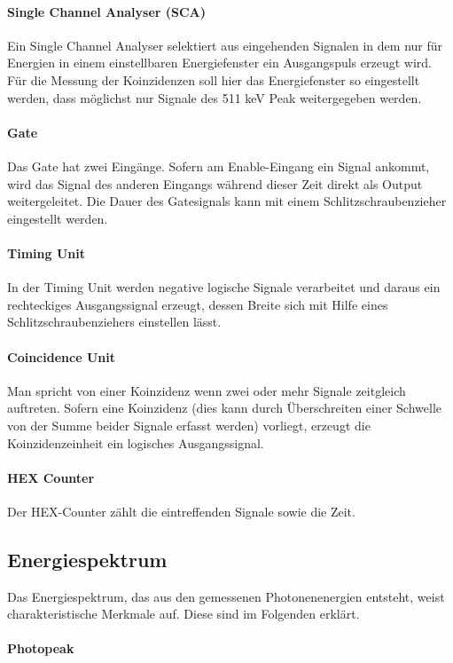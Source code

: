 \documentclass[12pt,listof=totoc]{scrartcl}
\begin{document}
 \paragraph{Single Channel Analyser (SCA)}
 Ein Single Channel Analyser selektiert aus eingehenden Signalen in dem nur für Energien in einem einstellbaren Energiefenster ein Ausgangspuls erzeugt wird.  Für die Messung der Koinzidenzen soll hier das Energiefenster so eingestellt werden, dass möglichst nur Signale des 511 keV Peak weitergegeben werden.
 \paragraph{Gate} Das Gate hat zwei Eingänge. Sofern am Enable-Eingang ein Signal ankommt, wird das Signal des anderen Eingangs während dieser Zeit direkt als Output weitergeleitet. Die Dauer des Gatesignals kann mit einem Schlitzschraubenzieher eingestellt werden.
 \paragraph{Timing Unit}
 In der Timing Unit werden negative logische Signale verarbeitet und daraus ein rechteckiges Ausgangssignal erzeugt, dessen Breite sich mit Hilfe eines Schlitzschraubenziehers einstellen lässt.
 \paragraph{Coincidence Unit}
 Man spricht von einer Koinzidenz wenn zwei oder mehr Signale zeitgleich auftreten. Sofern eine Koinzidenz (dies kann durch Überschreiten einer Schwelle von der Summe beider Signale erfasst werden) vorliegt, erzeugt die Koinzidenzeinheit ein logisches Ausgangssignal.
 \paragraph{HEX Counter}
Der HEX-Counter zählt die eintreffenden Signale sowie die Zeit.

\subsection{Energiespektrum}

Das Energiespektrum, das aus den gemessenen Photonenenergien entsteht, weist  charakteristische Merkmale auf. Diese sind im Folgenden erklärt. 
 
 
 \paragraph{Photopeak}
 
\end{document}
